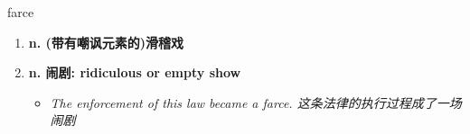 
\begin{frame}
{\huge farce}
\begin{center}
\begin{enumerate}\Large
  \item \textbf{n. (带有嘲讽元素的)滑稽戏}
  \item \textbf{n. 闹剧: ridiculous or empty show}
  \begin{itemize}
    \item \em{\Large{The enforcement of this law became a farce. 这条法律的执行过程成了一场闹剧}}
  \end{itemize}
\end{enumerate}
\end{center}
\end{frame}

